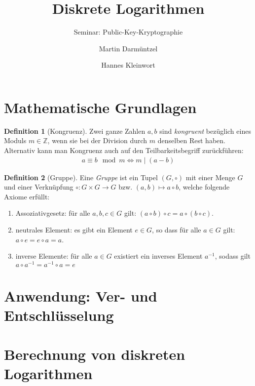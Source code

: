 \documentclass[
  a4paper,
  11pt,
]{scrartcl}
\title{Diskrete Logarithmen}
\subtitle{Seminar: Public-Key-Kryptographie}
\author{%
  Martin Darmüntzel \and Hannes Kleinwort
}
\theoremstyle{plain}
\theoremstyle{definition}
\newtheorem{definition}{Definition}
\theoremstyle{remark}
\newcommand{\Z}{\mathbb{Z}}
\begin{document}
\maketitle

\section{Mathematische Grundlagen}
\label{sec:mathematische_grundlagen}

\begin{definition}[Kongruenz]
  Zwei ganze Zahlen $a, b$ sind \emph{kongruent} bezüglich eines Moduls
  $m \in \Z$, wenn sie bei der Division durch $m$ denselben Rest haben.
  Alternativ kann man Kongruenz auch auf den Teilbarkeitsbegriff zurückführen:
  \begin{align*}
    a \equiv b \mod m \Leftrightarrow m \mid (a - b)
  \end{align*}
\end{definition}

\begin{definition}[Gruppe]
  Eine \emph{Gruppe} ist ein Tupel $(G, \circ)$ mit einer Menge $G$ und einer
  Verknüpfung $\circ: G \times G \to G$ bzw. $(a, b) \mapsto a \circ b$, welche
  folgende Axiome erfüllt:
  \begin{enumerate}
    \item Assoziativgesetz: für alle $a, b, c \in G$ gilt:
      $(a \circ b) \circ c = a \circ (b \circ c)$.
    \item neutrales Element: es gibt ein Element $e \in G$, so dass für
      alle $a \in G$ gilt: $a \circ e = e \circ a = a$.
    \item inverse Elemente: für alle $a \in G$ existiert ein inverses
      Element $a^{-1}$, sodass gilt $a \circ a^{-1} = a^{-1} \circ a = e$
  \end{enumerate}
\end{definition}

\section{Anwendung: Ver- und Entschlüsselung}
\label{sec:anwendung_ver_und_entschlusselung}

\section{Berechnung von diskreten Logarithmen}
\label{sec:berechnung_von_diskreten_logarithmen}
\end{document}
